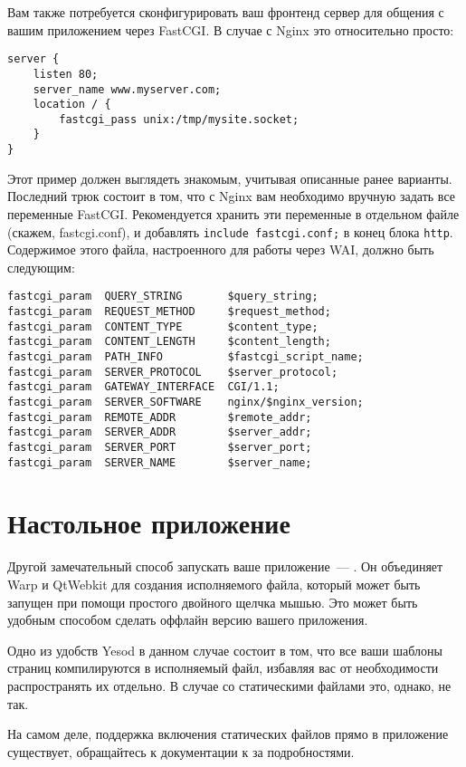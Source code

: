 Вам также потребуется сконфигурировать ваш фронтенд сервер для общения с вашим
приложением через FastCGI. В случае с Nginx это относительно просто:

\begin{lstlisting}
server {
    listen 80;
    server_name www.myserver.com;
    location / {
        fastcgi_pass unix:/tmp/mysite.socket;
    }
}
\end{lstlisting}

Этот пример должен выглядеть знакомым, учитывая описанные ранее варианты.
Последний трюк состоит в том, что с Nginx вам необходимо вручную задать все
переменные FastCGI. Рекомендуется хранить эти переменные в отдельном файле
(скажем, fastcgi.conf), и добавлять \lstinline{include fastcgi.conf;} в конец
блока \lstinline{http}. Содержимое этого файла, настроенного для работы через
WAI, должно быть следующим:

\begin{lstlisting}
fastcgi_param  QUERY_STRING       $query_string;
fastcgi_param  REQUEST_METHOD     $request_method;
fastcgi_param  CONTENT_TYPE       $content_type;
fastcgi_param  CONTENT_LENGTH     $content_length;
fastcgi_param  PATH_INFO          $fastcgi_script_name;
fastcgi_param  SERVER_PROTOCOL    $server_protocol;
fastcgi_param  GATEWAY_INTERFACE  CGI/1.1;
fastcgi_param  SERVER_SOFTWARE    nginx/$nginx_version;
fastcgi_param  REMOTE_ADDR        $remote_addr;
fastcgi_param  SERVER_ADDR        $server_addr;
fastcgi_param  SERVER_PORT        $server_port;
fastcgi_param  SERVER_NAME        $server_name;
\end{lstlisting}%

\section{Настольное приложение}
Другой замечательный способ запускать ваше приложение~---
.
Он объединяет Warp и QtWebkit для создания исполняемого файла, который может
быть запущен при помощи простого двойного щелчка мышью. Это может быть удобным
способом сделать оффлайн версию вашего приложения.

Одно из удобств Yesod в данном случае состоит в том, что все ваши шаблоны
страниц компилируются в исполняемый файл, избавляя вас от необходимости
распространять их отдельно. В случае со статическими файлами это, однако, не
так.

На самом деле, поддержка включения статических файлов прямо в приложение
существует, обращайтесь к документации к
 за
подробностями.

